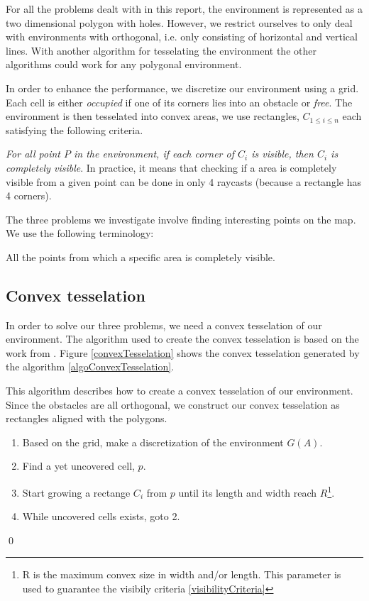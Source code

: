 For all the problems dealt with in this report, the environment is represented as a two dimensional polygon with holes. However, we restrict ourselves to only deal with environments with orthogonal, i.e. only consisting of horizontal and vertical lines. With another algorithm for tesselating the environment the other algorithms could work for any polygonal environment.

In order to enhance the performance, we discretize our environment using a grid. Each cell is either \emph{occupied} if one of its corners lies into an obstacle or \emph{free}.
The environment is then tesselated into convex areas, we use rectangles, $C_{1\leq i \leq n}$ each satisfying the following criteria.

\begin{criteria}[of Visibility]
 \emph{For all point $P$ in the environment, if each corner of $C_i$ is visible, then $C_i$ is completely visible}. In practice, it means that checking if a area is completely visible from a given point can be done in only 4 raycasts (because a rectangle has 4 corners).
\label{visibilityCriteria}
\end{criteria}


The three problems we investigate involve finding interesting points on the map. We use the following terminology:
\begin{definition}
All the points from which a specific area is completely visible.
\end{definition}

\subsection{Convex tesselation}

In order to solve our three problems, we need a convex tesselation of our environment. The algorithm used to create the convex tesselation is based on the work from \cite{CoopMinTime}. Figure \ref{convexTesselation} shows the convex tesselation generated by the algorithm \ref{algoConvexTesselation}.

\begin{algorithm}
This algorithm describes how to create a convex tesselation of our environment. Since the obstacles are all orthogonal, we construct our convex tesselation as rectangles aligned with the polygons.
\begin{enumerate}
\item Based on the grid, make a discretization of the environment $G(A)$.
\item Find a yet uncovered cell, $p$.
\item Start growing a rectange $C_i$ from $p$ until its length and width reach $R$\footnote{R is the maximum convex size in width and/or length. This parameter is used to guarantee the visibily criteria \ref{visibilityCriteria}}.
\item While uncovered cells exists, goto 2.
\end{enumerate}
\qed
\label{algoConvexTesselation}
\end{algorithm}

